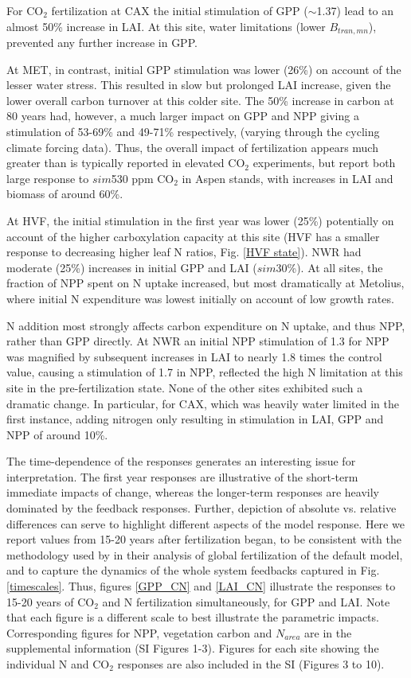 \documentclass[draft,linenumbers]{agujournal}
\begin{document}
For CO$_{2}$ fertilization at CAX the initial stimulation of GPP ($\sim$1.37) lead to an almost 50\% increase in LAI. At this site, water limitations (lower $B_{tran,mn}$), prevented any further increase in GPP. 

 At MET, in contrast, initial GPP stimulation was lower (26\%) on account of the lesser water stress. This resulted in slow but prolonged LAI increase, given the lower overall carbon turnover at this colder site. The 50\% increase in carbon at 80 years had, however, a much larger impact on GPP and NPP giving a stimulation of 53-69\% and 49-71\% respectively, (varying through the cycling climate forcing data). Thus, the overall impact of fertilization appears much greater than is typically reported in elevated CO$_{2}$ experiments, but \cite{king2005} report both large response to $sim$530 ppm CO$_{2}$ in Aspen stands, with increases in LAI and biomass of around 60\%.
 
 At HVF, the initial stimulation in the first year was lower (25\%) potentially on account of the higher carboxylation capacity at this site (HVF has a smaller response to decreasing higher leaf N ratios, Fig. \ref{HVF state}). NWR had moderate (25\%) increases in initial GPP and LAI ($sim$30\%).  At all sites, the fraction of NPP spent on N uptake increased, but most dramatically at Metolius, where initial N expenditure was lowest initially on account of low growth rates. 
 
N addition most strongly affects carbon expenditure on N uptake, and thus NPP, rather than GPP directly. At NWR an initial NPP stimulation of 1.3 for NPP was magnified by subsequent increases in LAI to nearly 1.8 times the control value, causing a stimulation of 1.7 in NPP, reflected the high N limitation at this site in the pre-fertilization state. None of the other sites exhibited such a dramatic change. In particular, for CAX, which was heavily water limited in the first instance, adding nitrogen only resulting in stimulation in LAI, GPP and NPP of around 10\%. 

The time-dependence of the responses generates an interesting issue for interpretation. The first year responses are illustrative of the short-term immediate impacts of change, whereas the longer-term responses are heavily dominated by the feedback responses. Further, depiction of absolute vs. relative differences can serve to highlight different aspects of the model response. Here we report values from 15-20 years after fertilization began, to be consistent with the methodology used by \cite{wieder2019} in their analysis of global fertilization of the default model, and to capture the dynamics of the whole system feedbacks captured in Fig. \ref{timescales}.  Thus, figures \ref{GPP_CN} and \ref{LAI_CN} illustrate the responses to 15-20 years of CO$_{2}$ and N  fertilization simultaneously, for GPP and LAI.  Note that each figure is a different scale to best illustrate the parametric impacts.  Corresponding figures for NPP, vegetation carbon and $N_{area}$ are in the supplemental information (SI Figures 1-3). Figures for each site showing the individual N and CO$_{2}$ responses are also included in the SI (Figures 3 to 10).  
\end{document}
